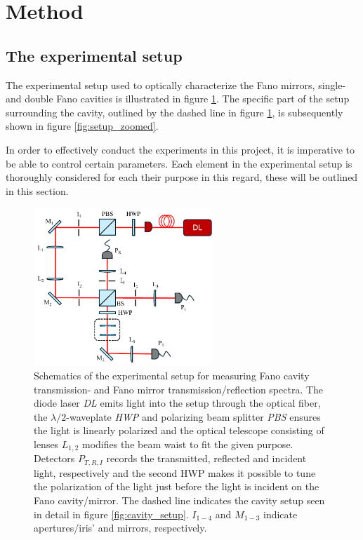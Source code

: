\section{Method}
\subsection{The experimental setup}\label{sec:experimental_setup}

The experimental setup used to optically characterize the Fano mirrors, single- and double Fano cavities is illustrated in figure \ref{fig:setup_sketch}. The specific part of the setup surrounding the cavity, outlined by the dashed line in figure \ref{fig:setup_sketch}, is subsequently shown in figure \ref{fig:setup_zoomed}. 

In order to effectively conduct the experiments in this project, it is imperative to be able to control certain parameters. Each element in the experimental setup is thoroughly considered for each their purpose in this regard, these will be outlined in this section. 

\begin{figure}[h!]
    \centering
    \includegraphics[width=0.6\textwidth]{figures/setup_sketch.pdf}
    \caption{Schematics of the experimental setup for measuring Fano cavity transmission- and Fano mirror transmission/reflection spectra. The diode laser \emph{DL} emits light into the setup through the optical fiber, the $\lambda/2$-waveplate \emph{HWP} and polarizing beam splitter \emph{PBS} ensures the light is linearly polarized and the optical telescope consisting of lenses $L_{1,2}$ modifies the beam waist to fit the given purpose. Detectors $P_{T,R,I}$ records the transmitted, reflected and incident light, respectively and the second HWP makes it possible to tune the polarization of the light just before the light is incident on the Fano cavity/mirror. The dashed line indicates the cavity setup seen in detail in figure \ref{fig:cavity_setup}. $I_{1-4}$ and $M_{1-3}$ indicate apertures/iris' and mirrors, respectively.}
    \label{fig:setup_sketch}
\end{figure}

